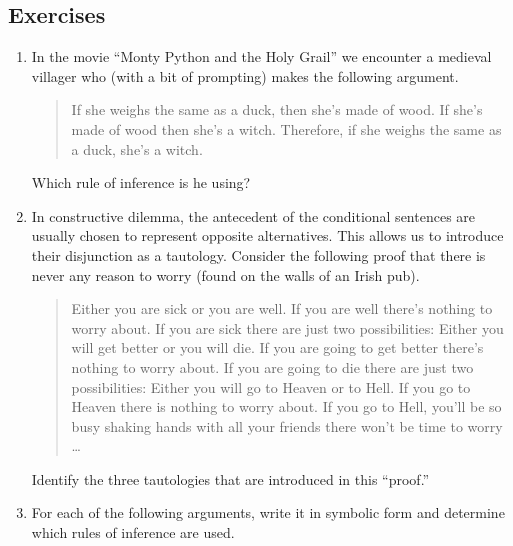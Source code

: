 \documentclass[10pt,]{book}
\theoremstyle{plain}
\theoremstyle{definition}
\theoremstyle{definition}
\numberwithin{equation}{section}
\newcommand{\hint}[1]{ }
\begin{document}
\subsection[{Exercises}]{Exercises}\label{exercises-13}
\leavevmode%
\begin{enumerate}[label=(\alph*)]
\item\hypertarget{li-199}{}
        In the movie ``Monty Python and the Holy Grail'' we encounter
        a medieval villager who (with a bit of prompting) makes the 
        following argument.
        \begin{quote}
        If she weighs the same as a duck, then she's made of wood. 
        If she's made of wood then she's a witch. 
        Therefore, if she weighs the same as a duck, she's a witch.
        \end{quote}

        Which rule of inference is he using?

        \hint{
        This is what many people refer to as the transitive rule of implication.  As an argument form it's known as ``hypothetical syllogism.''
        }
\item\hypertarget{li-200}{}
        In constructive dilemma, the antecedent of the conditional 
        sentences are usually chosen to represent opposite alternatives. 
        This allows us to introduce their disjunction as a tautology. 
        Consider the following proof that there is never any reason to worry
        (found on the walls of an Irish pub).
        \begin{quote}
        Either you are sick or you are well. 
        If you are well there's nothing to worry about. 
        If you are sick there are just two possibilities: 
        Either you will get better or you will die. 
        If you are going to get better there's nothing to worry about. 
        If you are going to die there are just two possibilities:
        Either you will go to Heaven or to Hell. 
        If you go to Heaven there is nothing to worry about.
        If you go to Hell, you'll be so busy shaking hands with all your friends there won't be time to worry \ldots
        \end{quote}

        Identify the three tautologies that are introduced in this ``proof.''

        \hint{Look at the lines that start with the word "Either."}
\item\hypertarget{li-201}{}
    For each of the following arguments, write it in symbolic form and determine 
    which rules of inference are used.


\end{enumerate}
\end{document}
